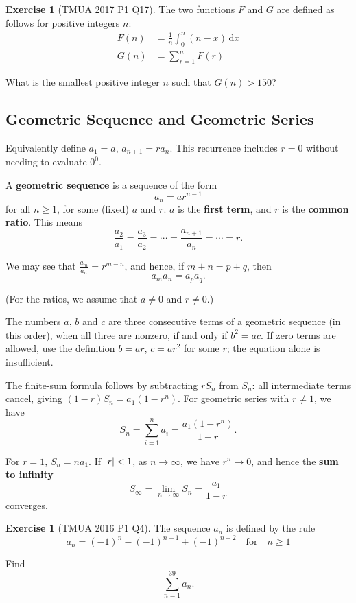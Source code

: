 \documentclass[11pt]{article}
\theoremstyle{definition}
\newtheorem{example}[theorem]{Exercise}
\theoremstyle{remark}
\newcommand{\pqty}[1]{\left(#1\right)}
\DeclarePairedDelimiter{\abs}{\lvert}{\rvert}
\newcommand{\flatfrac}[2]{\frac{#1}{#2}}
\newcommand{\qfor}{\quad\text{for}\quad}
\newcommand{\dd}[1]{\,\mathrm{d}#1}
\begin{document}
\begin{example}[TMUA 2017 P1 Q17]\label{tmua-4-unit-012}
    The two functions \(F\) and \(G\) are defined as follows for positive integers \(n\):
    \begin{align*}
        F\pqty{n} &= \frac{1}{n} \int_{0}^{n} \pqty{n - x} \dd{x} \\
        G\pqty{n} &= \sum_{r = 1}^{n} F\pqty{r}
    \end{align*}

    What is the smallest positive integer \(n\) such that \(G\pqty{n} > 150\)?
\end{example}

\subsection{Geometric Sequence and Geometric Series}
Equivalently define \(a_1=a\), \(a_{n+1}=ra_n\). This recurrence includes \(r=0\) without needing to evaluate \(0^0\).\label{tmua-4-subsection-003}

A \textbf{geometric sequence} is a sequence of the form
\[
    a_n = a r^{n - 1}
\]
for all \(n \geq 1\), for some (fixed) \(a\) and \(r\). \(a\) is the \textbf{first term}, and \(r\) is the \textbf{common ratio}. This means
\[
    \frac{a_2}{a_1} = \frac{a_3}{a_2} = \cdots = \frac{a_{n + 1}}{a_n} = \cdots = r.
\]

We may see that \(\flatfrac{a_m}{a_n} = r^{m - n}\), and hence, if \(m + n = p + q\), then
\[
    a_m a_n = a_p a_q.
\]

(For the ratios, we assume that \(a \neq 0\) and \(r \neq 0\).)

The numbers \(a\), \(b\) and \(c\) are three consecutive terms of a geometric sequence (in this order), when all three are nonzero, if and only if \(b^2=ac\). If zero terms are allowed, use the definition \(b=ar\), \(c=ar^2\) for some \(r\); the equation alone is insufficient.

The finite-sum formula follows by subtracting \(rS_n\) from \(S_n\): all intermediate terms cancel, giving \((1-r)S_n=a_1(1-r^n)\). For geometric series with \(r\ne1\), we have
\[
    S_n = \sum_{i = 1}^{n} a_i = \frac{a_1 \pqty{1 - r^n}}{1 - r}.
\]

For \(r=1\), \(S_n=na_1\). If \(\abs{r} < 1\), as \(n \to \infty\), we have \(r^n \to 0\), and hence the \textbf{sum to infinity}
\[
    S_\infty = \lim_{n \to \infty} S_n = \frac{a_1}{1 - r}
\]
converges.

\begin{example}[TMUA 2016 P1 Q4]\label{tmua-4-unit-013}
    The sequence \(a_n\) is defined by the rule
    \[
        a_n = \pqty{-1}^{n} - \pqty{-1}^{n - 1} + \pqty{-1}^{n + 2} \qfor n \geq 1
    \]

    Find
    \[
        \sum_{n = 1}^{39} a_n.
    \]
\end{example}
\end{document}
